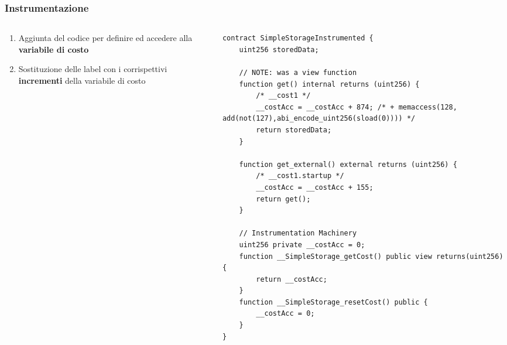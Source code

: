 \documentclass{beamer}
\begin{document}
\begin{frame}[fragile]
    \frametitle{Instrumentazione}
    \begin{columns}
        \begin{column}{0.4\textwidth}
            \begin{enumerate}
                \item Aggiunta del codice per definire ed accedere alla \textbf{variabile di costo}
                \item Sostituzione delle label con i corrispettivi \textbf{incrementi} della variabile di costo
            \end{enumerate}
        \end{column}
        \begin{column}{0.05\textwidth}
        \end{column}
        \begin{column}{0.55\textwidth}
            \begin{adjustbox}{max height=4cm,margin=0pt,keepaspectratio}
            \begin{lstlisting}[language=Solidity,frame=trlb,linewidth=12.3cm]
contract SimpleStorageInstrumented {
    uint256 storedData;

    // NOTE: was a view function
    function get() internal returns (uint256) {
        /* __cost1 */
        __costAcc = __costAcc + 874; /* + memaccess(128, add(not(127),abi_encode_uint256(sload(0)))) */
        return storedData;
    }

    function get_external() external returns (uint256) {
        /* __cost1.startup */
        __costAcc = __costAcc + 155;
        return get();
    }
    
    // Instrumentation Machinery
    uint256 private __costAcc = 0;
    function __SimpleStorage_getCost() public view returns(uint256) { 
        return __costAcc; 
    }
    function __SimpleStorage_resetCost() public {
        __costAcc = 0;
    }
}
            \end{lstlisting}
            \end{adjustbox}
            \end{column}
    \end{columns}
\end{frame}
\end{document}
